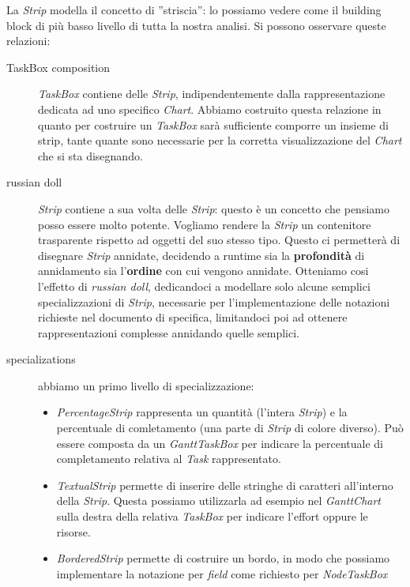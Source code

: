 La \emph{Strip} modella il concetto di ''striscia'': lo possiamo vedere come il
building block di pi\`u basso livello di tutta la nostra analisi. Si possono
osservare queste relazioni:
\begin{description}
  \item[TaskBox composition] \emph{TaskBox} contiene delle \emph{Strip},
  indipendentemente dalla rappresentazione dedicata ad uno specifico \emph{Chart}. Abbiamo costruito
  questa relazione in quanto per costruire un \emph{TaskBox} sar\`a sufficiente
  comporre un insieme di strip, tante quante sono necessarie per la corretta
  visualizzazione del \emph{Chart} che si sta disegnando.
  \item[russian doll] \emph{Strip} contiene a sua volta delle \emph{Strip}:
  questo \`e un concetto che pensiamo posso essere molto potente. Vogliamo rendere la
  \emph{Strip} un contenitore trasparente rispetto ad oggetti del suo stesso
  tipo. Questo ci permetter\`a di disegnare \emph{Strip} annidate, decidendo a
  runtime sia la \textbf{profondit\`a} di annidamento sia l'\textbf{ordine} con
  cui vengono annidate. Otteniamo cosi l'effetto di \emph{russian doll}, 
  dedicandoci a modellare solo alcune semplici specializzazioni di \emph{Strip},
  necessarie per l'implementazione delle notazioni richieste nel documento di specifica,
  limitandoci poi ad ottenere rappresentazioni complesse annidando quelle
  semplici.
  \item[specializations] abbiamo un primo livello di specializzazione:
  \begin{itemize}
    \item \emph{PercentageStrip} rappresenta un quantit\`a (l'intera
    \emph{Strip}) e la percentuale di comletamento (una parte di \emph{Strip}
    di colore diverso). Pu\`o essere composta da un \emph{GanttTaskBox} per
    indicare la percentuale di completamento relativa al \emph{Task}
    rappresentato.
    
    \item \emph{TextualStrip} permette di inserire delle stringhe di caratteri
    all'interno della \emph{Strip}. Questa possiamo utilizzarla ad esempio nel
    \emph{GanttChart} sulla destra della relativa \emph{TaskBox} per indicare
    l'effort oppure le risorse.
    
    \item \emph{BorderedStrip} permette di costruire un bordo, in modo che
    possiamo implementare la notazione per \emph{field} come richiesto per
    \emph{NodeTaskBox}
    

\end{itemize}
\end{description}
